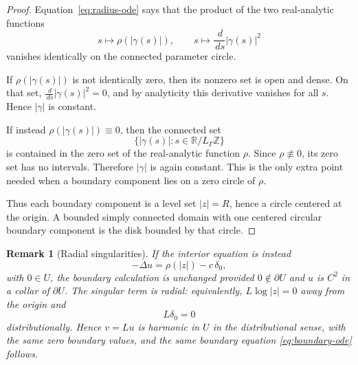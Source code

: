 \documentclass[11pt]{article}
\newtheorem{remark}[theorem]{Remark}
\newcommand{\R}{\mathbb R}
\newcommand{\Z}{\mathbb Z}
\newcommand{\dd}{\,d}
\newcommand{\1}{\mathbf 1}
\begin{document}
\begin{proof}
Equation~\eqref{eq:radius-ode} says that the product of the two real-analytic
functions
\[
  s\mapsto \rho(|\gamma(s)|),
  \qquad
  s\mapsto \frac{\dd}{\dd s}|\gamma(s)|^2
\]
vanishes identically on the connected parameter circle.

If \(\rho(|\gamma(s)|)\) is not identically zero, then its nonzero set is open
and dense.  On that set, \(\frac{\dd}{\dd s}|\gamma(s)|^2=0\), and by analyticity
this derivative vanishes for all \(s\).  Hence \(|\gamma|\) is constant.

If instead \(\rho(|\gamma(s)|)\equiv0\), then the connected set
\[
  \{|\gamma(s)|:s\in\R/L_\Gamma\Z\}
\]
is contained in the zero set of the real-analytic function \(\rho\).  Since
\(\rho\not\equiv0\), its zero set has no intervals.  Therefore \(|\gamma|\) is
again constant.  This is the only extra point needed when a boundary component
lies on a zero circle of \(\rho\).

Thus each boundary component is a level set \(|z|=R\), hence a circle centered
at the origin.  A bounded simply connected domain with one centered circular
boundary component is the disk bounded by that circle.
\end{proof}

\begin{remark}[Radial singularities]
If the interior equation is instead
\[
  -\Delta u=\rho(|z|)-c\,\delta_0,
\]
with \(0\in U\), the boundary calculation is unchanged provided \(0\notin\partial
U\) and \(u\) is \(C^2\) in a collar of \(\partial U\).  The singular term is
radial: equivalently, \(L\log|z|=0\) away from the origin and
\[
  L\delta_0=0
\]
distributionally.  Hence \(v=Lu\) is harmonic in \(U\) in the distributional
sense, with the same zero boundary values, and the same boundary equation
\eqref{eq:boundary-ode} follows.
\end{remark}
\end{document}
